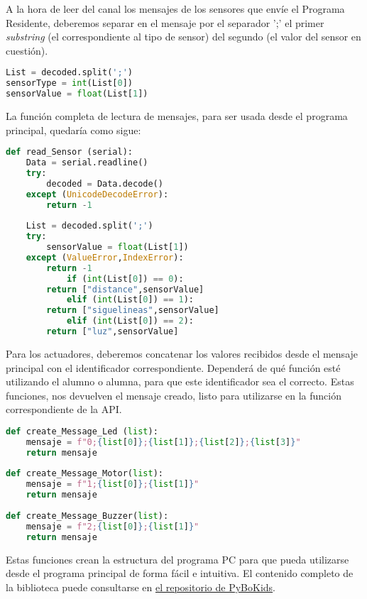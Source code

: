 A la hora de leer del canal los mensajes de los sensores que envíe el Programa Residente, deberemos separar en el mensaje por el separador ';' el primer \textit{substring} (el correspondiente al tipo de sensor) del segundo (el valor del sensor en cuestión).  
\begin{lstlisting}[language=python,caption={Decodificación de un mensaje en Python}]
List = decoded.split(';')
sensorType = int(List[0])
sensorValue = float(List[1])
\end{lstlisting}

La función completa de lectura de mensajes, para ser usada desde el programa principal, quedaría como sigue:

\begin{lstlisting}[language=python,caption={Decodificación de un mensaje en Python}]
def read_Sensor (serial):
	Data = serial.readline()
	try:
		decoded = Data.decode()
	except (UnicodeDecodeError):
		return -1 
	
	List = decoded.split(';')
	try:
		sensorValue = float(List[1])
	except (ValueError,IndexError):
		return -1 
			if (int(List[0]) == 0):
		return ["distance",sensorValue]
			elif (int(List[0]) == 1):
		return ["siguelineas",sensorValue]
			elif (int(List[0]) == 2):
		return ["luz",sensorValue]
\end{lstlisting}


Para los actuadores, deberemos concatenar los valores recibidos desde el mensaje principal con el identificador correspondiente. Dependerá de qué función esté utilizando el alumno o alumna, para que este identificador sea el correcto. Estas funciones, nos devuelven el mensaje creado, listo para utilizarse en la función correspondiente de la API.

\begin{lstlisting}[language=python,caption={Funciones en la biblioteca PC para la codificación de mensajes de los actuadores}]
def create_Message_Led (list):
	mensaje = f"0;{list[0]};{list[1]};{list[2]};{list[3]}"
	return mensaje
	
def create_Message_Motor(list):
	mensaje = f"1;{list[0]};{list[1]}"
	return mensaje
	
def create_Message_Buzzer(list):
	mensaje = f"2;{list[0]};{list[1]}"
	return mensaje
\end{lstlisting}


Estas funciones crean la estructura del programa PC para que pueda utilizarse desde el programa principal de forma fácil e intuitiva. El contenido completo de la biblioteca puede consultarse en \href{https://github.com/JdeRobot/PyBoKids/tree/main/PyBoKids%202.0}{el repositorio de PyBoKids}.


